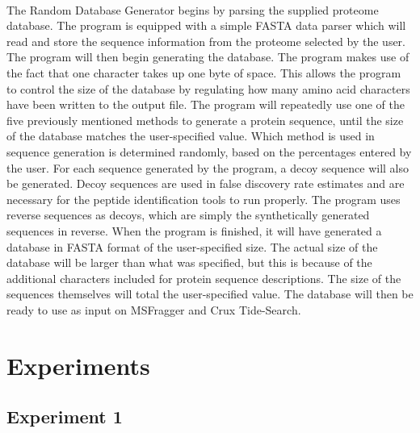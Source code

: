 \documentclass [11pt] {article}
\begin{document}
	\paragraph {}
	\qquad The Random Database Generator begins by parsing the supplied proteome database.  The program is equipped with a simple FASTA data parser which will read and store the sequence information from the proteome selected by the user.  The program will then begin generating the database.  The program makes use of the fact that one character takes up one byte of space.  This allows the program to control the size of the database by regulating how many amino acid characters have been written to the output file.  The program will repeatedly use one of the five previously mentioned methods to generate a protein sequence, until the size of the database matches the user-specified value.  Which method is used in sequence generation is determined randomly, based on the percentages entered by the user.  For each sequence generated by the program, a decoy sequence will also be generated.  Decoy sequences are used in false discovery rate estimates and are necessary for the peptide identification tools to run properly.  The program uses reverse sequences as decoys, which are simply the synthetically generated sequences in reverse.  When the program is finished, it will have generated a database in FASTA format of the user-specified size.  The actual size of the database will be larger than what was specified, but this is because of the additional characters included for protein sequence descriptions.  The size of the sequences themselves will total the user-specified value.  The database will then be ready to use as input on MSFragger and Crux Tide-Search.
	
	
	\section {Experiments}
	
	\subsection {Experiment 1}
	
\end{document}
